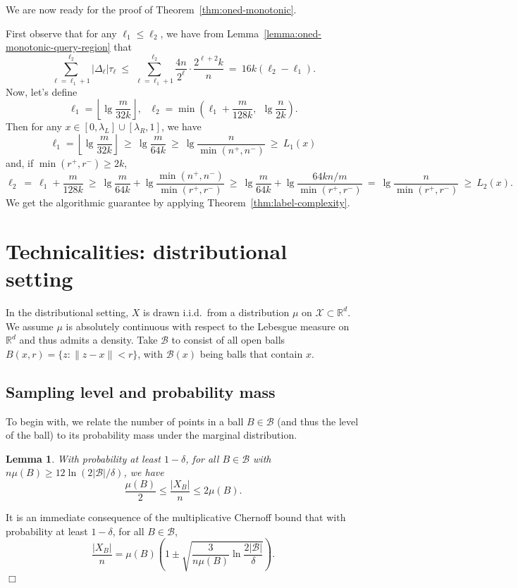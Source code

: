 \documentclass{article}
\def\R{{\mathbb{R}}}
\def\X{{\mathcal X}}
\def\B{{\mathcal B}}
\newtheorem{lemma}[thm]{Lemma}
\newenvironment{proof}{\noindent {\sc Proof:}}{$\Box$ \medskip}
\begin{document}
We are now ready for the proof of Theorem~\ref{thm:oned-monotonic}.

First observe that for any $\ell_1 \leq \ell_2$, we have from Lemma~\ref{lemma:oned-monotonic-query-region} that
$$ \sum_{\ell=\ell_1+1}^{\ell_2} |\Delta_\ell| \tau_\ell 
\ \leq \ \sum_{\ell=\ell_1+1}^{\ell_2} \frac{4n}{2^\ell} \cdot \frac{2^{\ell+2} k}{n} 
\ = \ 16k(\ell_2-\ell_1).$$
Now, let's define
$$ \ell_1 = \left\lfloor \lg \frac{m}{32k} \right\rfloor, 
\ \ \ \ell_2 = \min \left( \ell_1 + \frac{m}{128k}, \ \ \lg \frac{n}{2k} \right).$$
Then for any $x \in [0, \lambda_L] \cup [\lambda_R,1]$, we have
$$ \ell_1 = \left\lfloor \lg \frac{m}{32k} \right\rfloor 
\ \geq \ 
\lg \frac{m}{64k}
\ \geq \ 
\lg \frac{n}{\min(n^+,n^-)}
\ \geq \ 
L_1(x)$$
and, if $\min(r^+, r^-) \geq 2k$,
$$ \ell_2 
\ = \ \ell_1 + \frac{m}{128k} 
\ \geq \ \lg \frac{m}{64k} + \lg \frac{\min(n^+,n^-)}{\min(r^+,r^-)} 
\ \geq \ \lg \frac{m}{64k} + \lg \frac{64kn/m}{\min(r^+,r^-)} 
\ = \ \lg \frac{n}{\min(r^+,r^-)}
\ \geq \ 
L_2(x).
$$
We get the algorithmic guarantee by applying Theorem~\ref{thm:label-complexity}. 

\section{Technicalities: distributional setting}

In the distributional setting, $X$ is drawn i.i.d.\ from a distribution $\mu$ on $\X \subset \R^d$.  We assume $\mu$ is absolutely continuous with respect to the Lebesgue measure on $\R^d$ and thus admits a density. Take $\B$ to consist of all open balls $B(x,r) = \{z: \|z-x\| < r\}$, with $\B(x)$ being balls that contain $x$.

\subsection{Sampling level and probability mass}

To begin with, we relate the number of points in a ball $B \in \B$ (and thus the level of the ball) to its probability mass under the marginal distribution.
\begin{lemma}
With probability at least $1-\delta$, for all $B \in \B$ with $n \mu(B) \geq 12 \ln (2|\B|/\delta)$, we have
$$ \frac{\mu(B)}{2} \leq \frac{|X_B|}{n} \leq 2 \mu(B) .$$
\label{lemma:ball-size-bounds}
\end{lemma}
\begin{proof}
It is an immediate consequence of the multiplicative Chernoff bound that with probability at least $1-\delta$, for all $B \in \B$,
$$ \frac{|X_B|}{n} = \mu(B) \left(1 \pm \sqrt{\frac{3}{n \mu(B)} \ln \frac{2|\B|}{\delta}} \right) .$$
\end{proof}
\end{document}
